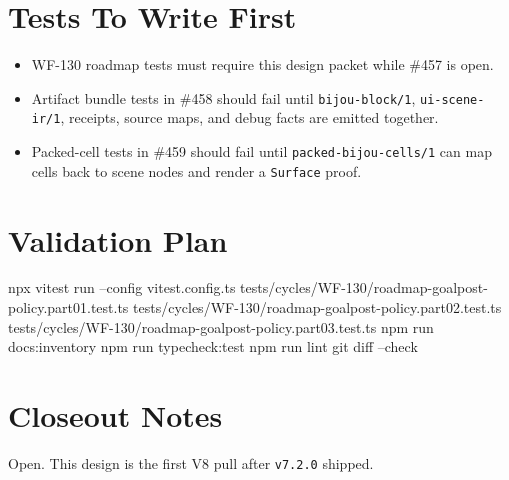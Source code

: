 \section{Tests To Write First}\label{record-144-tests-to-write-first}

\begin{itemize}
\tightlist
\item
  WF-130 roadmap tests must require this design packet while \#457 is open.
\item
  Artifact bundle tests in \#458 should fail until \texttt{b\allowbreak{}i\allowbreak{}j\allowbreak{}o\allowbreak{}u\allowbreak{}-\allowbreak{}b\allowbreak{}l\allowbreak{}o\allowbreak{}c\allowbreak{}k\allowbreak{}/\allowbreak{}1}, \texttt{u\allowbreak{}i\allowbreak{}-\allowbreak{}s\allowbreak{}c\allowbreak{}e\allowbreak{}n\allowbreak{}e\allowbreak{}-\allowbreak{}i\allowbreak{}r\allowbreak{}/\allowbreak{}1}, receipts, source maps, and debug facts are emitted together.
\item
  Packed-cell tests in \#459 should fail until \texttt{p\allowbreak{}a\allowbreak{}c\allowbreak{}k\allowbreak{}e\allowbreak{}d\allowbreak{}-\allowbreak{}b\allowbreak{}i\allowbreak{}j\allowbreak{}o\allowbreak{}u\allowbreak{}-\allowbreak{}c\allowbreak{}e\allowbreak{}l\allowbreak{}l\allowbreak{}s\allowbreak{}/\allowbreak{}1} can map cells back to scene nodes and render a \texttt{S\allowbreak{}u\allowbreak{}r\allowbreak{}f\allowbreak{}a\allowbreak{}c\allowbreak{}e} proof.
\end{itemize}

\section{Validation Plan}\label{record-144-validation-plan}

\begin{CodeBlock}
npx vitest run --config vitest.config.ts tests/cycles/WF-130/roadmap-goalpost-policy.part01.test.ts tests/cycles/WF-130/roadmap-goalpost-policy.part02.test.ts tests/cycles/WF-130/roadmap-goalpost-policy.part03.test.ts
npm run docs:inventory
npm run typecheck:test
npm run lint
git diff --check
\end{CodeBlock}

\section{Closeout Notes}\label{record-144-closeout-notes}

Open. This design is the first V8 pull after \texttt{v\allowbreak{}7\allowbreak{}.\allowbreak{}2\allowbreak{}.\allowbreak{}0} shipped.

